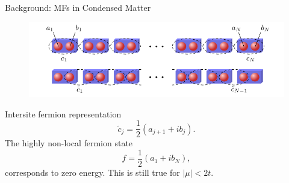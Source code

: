 \documentclass[xcolor=dvipsnames,10pt,aspectratio=169]{beamer}
\newcommand{\BD}{Background}
\begin{document}
  \begin{frame}{\BD: MFs in Condensed Matter}
    \begin{figure}
      \includegraphics[width=\textwidth]{./figures/kitaev-chain.pdf}
    \end{figure}

    Intersite fermion representation
    \begin{equation}
      \tilde{c}_j = \dfrac{1}{2}(a_{j+1} + i b_j).
    \end{equation}
    The highly non-local fermion state
    \begin{equation}
      f = \dfrac{1}{2}(a_{1} + i b_N),
    \end{equation}
    corresponds to zero energy. This is still true for $|\mu|< 2t$.
  \end{frame}
\end{document}
